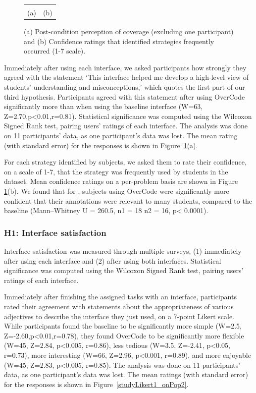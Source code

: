 \begin{figure}[t!]
\begin{tabular}{c | c}
\begin{minipage}{.5\linewidth}
\end{minipage}
\\
(a) & (b)
\end{tabular}
\caption{(a) Post-condition perception of coverage (excluding one participant) and (b) Confidence ratings that identified strategies frequently occurred (1-7 scale).}
\label{perceivedCoverage}
\end{figure}

Immediately after using each interface, we asked participants how strongly they agreed with the statement `This interface helped me develop a high-level view of students' understanding and misconceptions,' which quotes the first part of our third hypothesis. Participants agreed with this statement after using OverCode significantly more than when using the baseline interface (W=63, Z=2.70,p<0.01,r=0.81). Statistical significance was computed using the Wilcoxon Signed Rank test, pairing users' ratings of each interface. The analysis was done on 11 participants' data, as one participant's data was lost. The mean rating (with standard error) for the responses is shown in Figure~\ref{perceivedCoverage}(a). 

For each strategy identified by subjects, we asked them to rate their confidence, on a scale of 1-7, that the strategy was frequently used by students in the dataset. Mean confidence ratings on a per-problem basis are shown in Figure \ref{perceivedCoverage}(b). We found that for , subjects using OverCode were significantly more confident that their annotations were relevant to many students, compared to the baseline (Mann--Whitney U = 260.5, n1 = 18 n2 = 16, p< 0.0001).
 
\subsubsection{H1: Interface satisfaction}

Interface satisfaction was measured through multiple surveys, (1) immediately after using each interface and (2) after using both interfaces. Statistical significance was computed using the Wilcoxon Signed Rank test, pairing users' ratings of each interface. 

Immediately after finishing the assigned tasks with an interface, participants rated their agreement with statements about the appropriateness of various adjectives to describe the interface they just used, on a 7-point Likert scale. While participants found the baseline to be significantly more simple (W=2.5, Z=-2.60,p<0.01,r=0.78), they found OverCode to be significantly more flexible (W=45, Z=2.84, p<0.005, r=0.86), less tedious (W=3.5, Z=-2.41, p<0.05, r=0.73), more interesting (W=66, Z=2.96, p<0.001, r=0.89), and more enjoyable (W=45, Z=2.83, p<0.005, r=0.85). The analysis was done on 11 participants' data, as one participant's data was lost. The mean ratings (with standard error) for the responses is shown in Figure~\ref{studyLikert1_onPop2}. 

